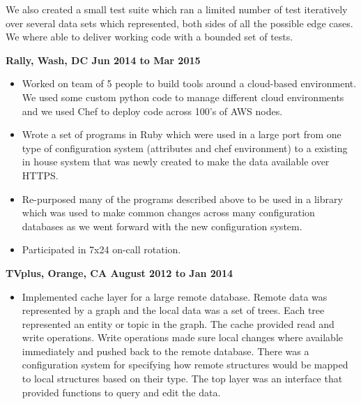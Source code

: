 \documentclass{res}
\begin{document}
\begin{resume}
\begin{itemize}
            We also created a small test suite which ran a limited
            number of test iteratively over several data sets which
            represented, both sides of all the possible edge cases.
            We where able to deliver working code with a bounded set
            of tests.

          \end{itemize}

          {\large \bf Rally, Wash, DC \hfill Jun 2014 to Mar 2015}

          \begin{itemize}

          \item
	    Worked on team of 5 people to build tools around a
            cloud-based environment.  We used some custom python code
            to manage different cloud environments and we used Chef to
            deploy code across 100's of AWS nodes.

          \item
	    Wrote a set of programs in Ruby which were used in a large
            port from one type of configuration system (attributes and
            chef environment) to a existing in house system that was
            newly created to make the data available over HTTPS.

          \item

	    Re-purposed many of the programs described above to be
            used in a library which was used to make common changes
            across many configuration databases as we went forward
            with the new configuration system.

          \item

    	    Participated in 7x24 on-call rotation.

          \end{itemize}

          {\large \bf TVplus, Orange, CA \hfill August 2012 to Jan 2014}

          \begin{itemize}

          \item
	    Implemented cache layer for a large remote database.
            Remote data was represented by a graph and the local data
            was a set of trees.  Each tree represented an entity or
            topic in the graph.  The cache provided read and write
            operations.  Write operations made sure local changes
            where available immediately and pushed back to the remote
            database.  There was a configuration system for specifying
            how remote structures would be mapped to local structures
            based on their type.  The top layer was an interface that
            provided functions to query and edit the data.


\end{itemize}
\end{resume}
\end{document}
